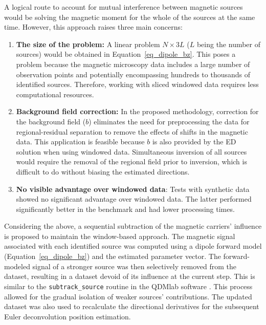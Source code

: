     A logical route to account for mutual interference between magnetic sources would be solving the magnetic moment for the whole of the sources at the same time. However, this approach raises three main concerns:
    
    \begin{enumerate}
        \item \textbf{The size of the problem:} A linear problem $N \times 3L$ ($L$ being the number of sources) would be obtained in Equation~\ref{eq_dipole_bz}. This poses a problem because the magnetic microscopy data includes a large number of observation points and potentially encompassing hundreds to thousands of identified sources. Therefore, working with sliced windowed data requires less computational resources.
        
        \item \textbf{Background field correction:} In the proposed methodology, correction for the background field ($b$) eliminates the need for preprocessing the data for regional-residual separation to remove the effects of shifts in the magnetic data. This application is feasible because $b$ is also provided by the ED solution when using windowed data. Simultaneous inversion of all sources would require the removal of the regional field prior to inversion, which is difficult to do without biasing the estimated directions.
        
        \item \textbf{No visible advantage over windowed data}: Tests with synthetic data \citep[see supplementary Jupyter notebooks in][]{figshare} showed no significant advantage over windowed data. The latter performed significantly better in the benchmark and had lower processing times.

    \end{enumerate}
    
    Considering the above, a sequential subtraction of the magnetic carriers' influence is proposed to maintain the window-based approach. The magnetic signal associated with each identified source was computed using a dipole forward model (Equation~\ref{eq_dipole_bz}) and the estimated parameter vector. The forward-modeled signal of a stronger source was then selectively removed from the dataset, resulting in a dataset devoid of its influence at the current step. 
    This is similar to the \texttt{subtrack\_source} routine in the QDMlab software \citep{Volk2022}. This process allowed for the gradual isolation of weaker sources' contributions. The updated dataset was also used to recalculate the directional derivatives for the subsequent Euler deconvolution position estimation.


